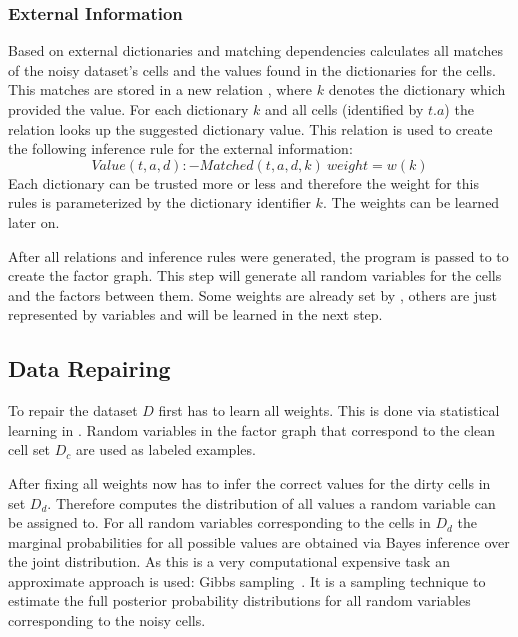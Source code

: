   \subsubsection*{External Information}
  Based on external dictionaries and matching dependencies \holoclean{} calculates all matches of the noisy dataset's cells and the values found in the dictionaries for the cells.
  This matches are stored in a new relation , where $k$ denotes the dictionary which provided the value.
  For each dictionary $k$ and all cells (identified by $t.a$) the relation  looks up the suggested dictionary value.
  This relation is used to create the following inference rule for the external information:
  \begin{equation}
    Value(t,a,d):-Matched(t,a,d,k)\ weight=w(k)\label{equ:matching}
  \end{equation}
  Each dictionary can be trusted more or less and therefore the weight for this rules is parameterized by the dictionary identifier $k$.
  The weights can be learned later on.
  
  \bigskip
  After all relations and inference rules were generated, the \ddlog{} program is passed to \deepdive{} to create the factor graph.
  This step will generate all random variables for the cells and the factors between them.
  Some weights are already set by \holoclean{}, others are just represented by variables and will be learned in the next step.
  
  \subsection{Data Repairing}
  To repair the dataset $D$ \holoclean{} first has to learn all weights.
  This is done via statistical learning in \deepdive{}.
  Random variables in the factor graph that correspond to the clean cell set $D_c$ are used as labeled examples.
  
  After fixing all weights \holoclean{} now has to infer the correct values for the dirty cells in set $D_d$.
  Therefore \holoclean{} computes the distribution of all values a random variable can be assigned to.
  For all random variables corresponding to the cells in $D_d$ the marginal probabilities for all possible values are obtained via Bayes inference over the joint distribution.
  As this is a very computational expensive task an approximate approach is used: Gibbs sampling~\cite{gibbssampling}.
  It is a sampling technique to estimate the full posterior probability distributions for all random variables corresponding to the noisy cells.
  
